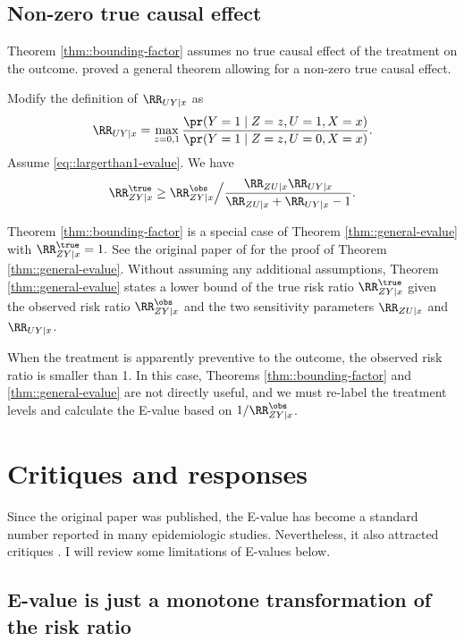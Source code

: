 \subsection{Non-zero true causal effect}
 
Theorem \ref{thm::bounding-factor} assumes no true causal effect of the treatment on the outcome. \citet{ding2016sensitivity} proved a general theorem allowing for a non-zero true causal effect.


\begin{theorem}
\label{thm::general-evalue}
Modify the definition of  $\RR_{UY\mid x}   $ as
$$
 \RR_{UY\mid x}  =  \max_{z=0,1} \frac{  \pr(Y=1\mid Z=z, U=1, X=x) }{  \pr(Y=1\mid Z=z, U=0, X=x) }.
$$
Assume \eqref{eq::largerthan1-evalue}. 
We have 
$$
\RR_{ZY\mid x}^\true \geq 
\RR_{ZY\mid x}^\obs \Big /  \frac{ \RR_{ZU\mid x}  \RR_{UY\mid x} }{  \RR_{ZU\mid x} + \RR_{UY\mid x} - 1} .
$$
\end{theorem}

Theorem \ref{thm::bounding-factor} is a special case of  Theorem \ref{thm::general-evalue} with $\RR_{ZY\mid x}^\true   = 1.$
See the original paper of \citet{ding2016sensitivity} for the proof of Theorem \ref{thm::general-evalue}.  Without assuming any additional assumptions, Theorem \ref{thm::general-evalue} states a lower bound of the true risk ratio $\RR_{ZY\mid x}^\true$ given the observed risk ratio $\RR_{ZY\mid x}^\obs$ and the two sensitivity parameters $\RR_{ZU\mid x} $ and $ \RR_{UY\mid x}$. 


When the treatment is apparently preventive to the outcome, the observed risk ratio is smaller than 1. In this case, Theorems \ref{thm::bounding-factor} and \ref{thm::general-evalue} are not directly useful, and we must re-label the treatment levels and calculate the E-value based on $1/ \RR_{ZY\mid x}^\obs$. 




\section{Critiques and responses}

Since the original paper was published,  the E-value has become a standard number reported in many epidemiologic studies. Nevertheless, it also attracted critiques \citep{ioannidis2019limitations}. I will review some limitations of E-values below. 



\subsection{E-value is just a monotone transformation of the risk ratio}
\label{sec::evalue-monotone}



